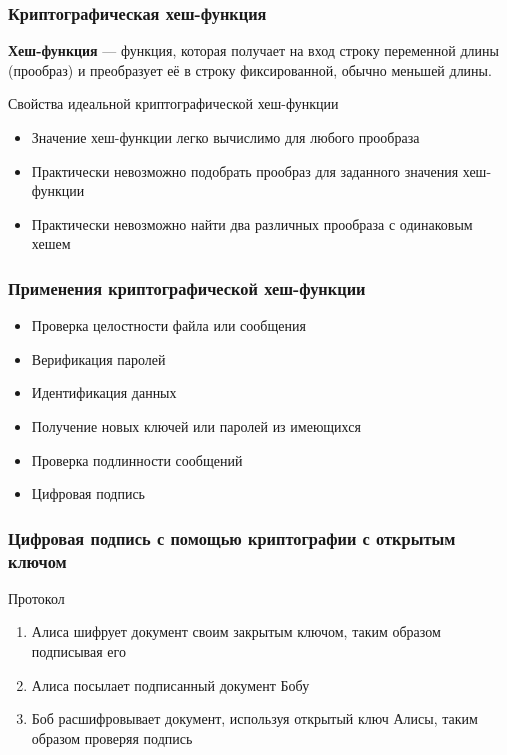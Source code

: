 \documentclass{beamer}
\newcommand{\define}[2]{{\bf #1} --- #2.\vspace{1em}}
\begin{document}
\begin{frame}
  \frametitle{Криптографическая хеш-функция}

  \define {Хеш-функция} {функция, которая получает на вход строку переменной длины (прообраз) и преобразует её в строку
           фиксированной, обычно меньшей длины}
  \begin{block} {Свойства идеальной криптографической хеш-функции}
    \begin{itemize}
      \item{Значение хеш-функции легко вычислимо для любого прообраза}
      \item{Практически невозможно подобрать прообраз для заданного значения хеш-функции}
      \item{Практически невозможно найти два различных прообраза с одинаковым хешем}
    \end{itemize}
  \end{block}
\end{frame}


\begin{frame}
  \frametitle{Применения криптографической хеш-функции}

  \begin{itemize}
    \item{Проверка целостности файла или сообщения}
    \item{Верификация паролей}
    \item{Идентификация данных}
    \item{Получение новых ключей или паролей из имеющихся}
    \item{Проверка подлинности сообщений}
    \item{Цифровая подпись}
  \end{itemize}
\end{frame}


\begin{frame}
  \frametitle{Цифровая подпись с помощью криптографии с открытым ключом}

  \begin{block} {Протокол}
    \begin{enumerate}
      \item{Алиса шифрует документ своим закрытым ключом, таким образом подписывая его}
      \item{Алиса посылает подписанный документ Бобу}
      \item{Боб расшифровывает документ, используя открытый ключ Алисы, таким образом проверяя подпись}
    \end{enumerate}
  \end{block}
\end{frame}
\end{document}

